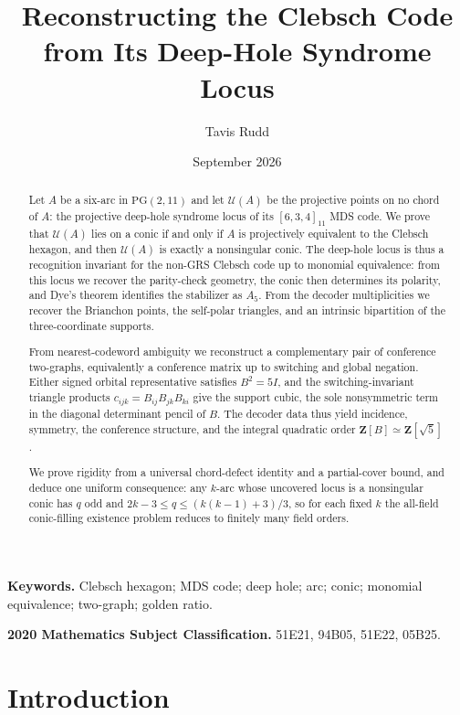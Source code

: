 \documentclass[11pt]{article}
\title{Reconstructing the Clebsch Code\\
from Its Deep-Hole Syndrome Locus}
\author{Tavis Rudd}
\date{September 2026}
\theoremstyle{definition}
\theoremstyle{remark}
\newcommand{\PG}{\mathrm{PG}}
\newcommand{\cU}{\mathcal{U}}
\begin{document}
\maketitle

\begin{abstract}
Let $A$ be a six-arc in $\PG(2,11)$ and let $\cU(A)$ be the projective points
on no chord of $A$: the projective deep-hole syndrome locus of its
$[6,3,4]_{11}$ MDS code.  We prove that $\cU(A)$ lies on a conic if and only
if $A$ is projectively equivalent to the Clebsch hexagon, and then $\cU(A)$
is exactly a nonsingular conic.  The deep-hole locus is thus a recognition
invariant for the non-GRS Clebsch code up to monomial equivalence: from this
locus we recover the parity-check geometry, the conic then
determines its polarity, and Dye's theorem identifies the stabilizer as
$A_5$.  From the decoder multiplicities we recover the Brianchon points, the
self-polar triangles, and an intrinsic bipartition of the three-coordinate
supports.

From nearest-codeword ambiguity we reconstruct a complementary pair of
conference two-graphs, equivalently a conference matrix up to
switching and global negation.  Either signed orbital representative satisfies
$B^2=5I$, and
the switching-invariant triangle products
$c_{ijk}=B_{ij}B_{jk}B_{ki}$ give the support cubic, the
sole nonsymmetric term in the diagonal determinant pencil of $B$.  The
decoder data thus yield incidence, symmetry, the conference structure, and the
integral quadratic order $\mathbf Z[B]\simeq\mathbf Z[\sqrt5]$.

We prove rigidity from a universal chord-defect identity and a partial-cover
bound, and deduce one uniform consequence: any $k$-arc whose uncovered locus
is a nonsingular conic has $q$ odd and $2k-3\le q\le(k(k-1)+3)/3$, so for
each fixed $k$ the all-field conic-filling existence problem reduces to
finitely many field orders.
\end{abstract}

\noindent\textbf{Keywords.} Clebsch hexagon; MDS code; deep hole; arc;
conic; monomial equivalence; two-graph; golden ratio.

\smallskip
\noindent\textbf{2020 Mathematics Subject Classification.} 51E21, 94B05,
51E22, 05B25.

\section{Introduction}
\label{sec:intro}
\end{document}
